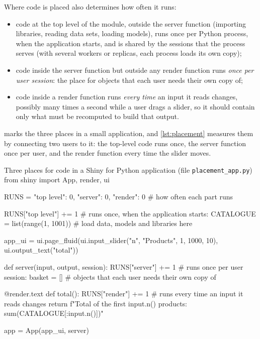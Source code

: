 Where code is placed also determines how often it runs:
\begin{itemize}
  \item code at the top level of the module, outside the server function (importing libraries, reading data sets, loading
        models), runs once per Python process, when the
        application starts, and is shared by the sessions that the process serves (with several workers or
        replicas, each process loads its own copy);
  \item code inside the server function but outside any render function runs \emph{once per user session}: the place for objects
        that each user needs their own copy of;
  \item code inside a render function runs \emph{every time} an input it reads changes, possibly many times a second while a user
        drags a slider, so it should contain only what must be recomputed to build that output.
\end{itemize}
 marks the three places in a small application, and \cref{lst:placement} measures them by connecting two
users to it: the top-level code runs once, the server function once per user, and the render function every time the slider
moves.

\begin{pylisting}[label={lst:placementapp}]{Three places for code in a Shiny for Python application (file \texttt{placement\_app.py})}
from shiny import App, render, ui

RUNS = {"top level": 0, "server": 0, "render": 0}        # how often each part runs

RUNS["top level"] += 1             # runs once, when the application starts:
CATALOGUE = list(range(1, 1001))   # load data, models and libraries here

app_ui = ui.page_fluid(ui.input_slider("n", "Products", 1, 1000, 10),
                       ui.output_text("total"))

def server(input, output, session):
    RUNS["server"] += 1            # runs once per user session:
    basket = []                    # objects that each user needs their own copy of

    @render.text
    def total():
        RUNS["render"] += 1        # runs every time an input it reads changes
        return f"Total of the first {input.n()} products: {sum(CATALOGUE[:input.n()])}"

app = App(app_ui, server)
\end{pylisting}

